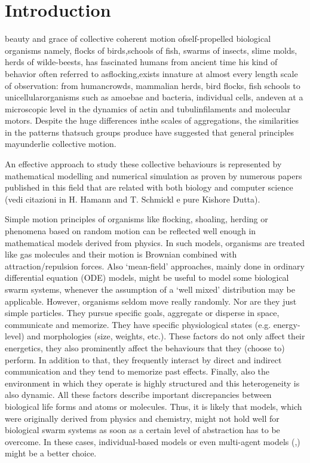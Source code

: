 \section{Introduction}

 beauty and grace of collective coherent
motion ofself-propelled biological organisms namely, flocks of birds,schools of fish, swarms of insects,
slime molds, herds of wilde-beests, has fascinated humans from ancient time his
kind of behavior often referred to asflocking,exists innature at almost every
length scale of observation: from humancrowds, mammalian herds, bird flocks,
fish schools to unicellularorganisms such as amoebae and bacteria, individual
cells, andeven at a microscopic level in the dynamics of actin and
tubulinfilaments and molecular motors. Despite the huge differences inthe scales
of aggregations, the similarities in the patterns thatsuch groups produce have
suggested that general principles mayunderlie collective motion.

An effective approach to study these collective behaviours is represented by
mathematical modelling and numerical simulation as proven by numerous papers
published in this field that are related with both biology and computer
science (vedi citazioni in H. Hamann and T. Schmickl e pure Kishore Dutta).



Simple motion principles of organisms like flocking, shoaling, herding or phenomena
based on random motion can be reflected well enough in mathematical models derived
from physics. In such models, organisms are treated like gas molecules and their motion is
Brownian combined with attraction/repulsion forces. Also ‘mean-field’ approaches, mainly done
in ordinary differential equation (ODE) models, might be useful to model some biological
swarm systems, whenever the assumption of a ‘well mixed’ distribution may be applicable.
However, organisms seldom move really randomly. Nor are they just simple particles. They
pursue specific goals, aggregate or disperse in space, communicate and memorize. They
have specific physiological states (e.g. energy-level) and morphologies (size, weights, etc.).
These factors do not only affect their energetics, they also prominently affect the behaviours
that they (choose to) perform. In addition to that, they frequently interact by direct and indirect
communication and they tend to memorize past effects. Finally, also the environment
in which they operate is highly structured and this heterogeneity is also dynamic.
All these factors describe important discrepancies between biological life forms
and atoms or molecules. Thus, it is likely that models, which were originally derived from physics and chemistry, might not hold well
for biological swarm systems as soon as a certain level of abstraction has to be overcome.
In these cases, individual-based models or even multi-agent
models (\cite{Ferber},\cite{Woolridge}) might be a better choice.

